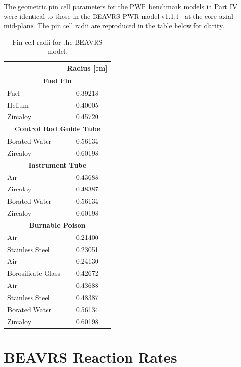 \begin{appendices}
The geometric pin cell parameters for the \ac{PWR} benchmark models in Part IV were identical to those in the \ac{BEAVRS} \ac{PWR} model v1.1.1~\cite{horelik2013beavrs} at the core axial mid-plane. The pin cell radii are reproduced in the table below for clarity.

\renewcommand{\arraystretch}{0.9}
\begin{table}[h!]
  \centering
  \caption[BEAVRS pin cell radii]{Pin cell radii for the \ac{BEAVRS} model.}
  \small
  \label{table:app-pin-cell-radii} 
  \vspace{6pt}
  \begin{tabular}{l c}
  \toprule
  \rowcolor{lightgray}
  \multicolumn{1}{c}{\bf Material} &
  \multicolumn{1}{c}{\bf Radius [cm]} \\
  \midrule
  \multicolumn{2}{c}{\bf Fuel Pin} \\
  \midrule
  Fuel &  0.39218 \\
  Helium & 0.40005 \\
  Zircaloy & 0.45720 \\
  \midrule
  \multicolumn{2}{c}{\bf Control Rod Guide Tube} \\
  \midrule
  Borated Water & 0.56134 \\
  Zircaloy & 0.60198 \\
  \midrule
  \multicolumn{2}{c}{\bf Instrument Tube} \\
  \midrule
  Air & 0.43688 \\
  Zircaloy & 0.48387 \\
  Borated Water & 0.56134 \\
  Zircaloy & 0.60198 \\
  \midrule
  \multicolumn{2}{c}{\bf Burnable Poison} \\
  \midrule
  Air & 0.21400 \\
  Stainless Steel & 0.23051 \\
  Air & 0.24130 \\
  Borosilicate Glass & 0.42672 \\
  Air & 0.43688 \\
  Stainless Steel & 0.48387 \\
  Borated Water & 0.56134 \\
  Zircaloy & 0.60198 \\
  \bottomrule
\end{tabular}
\end{table}

\clearpage

\section{BEAVRS Reaction Rates}
\label{sec:beavrs-rxn-rates}


\end{appendices}
